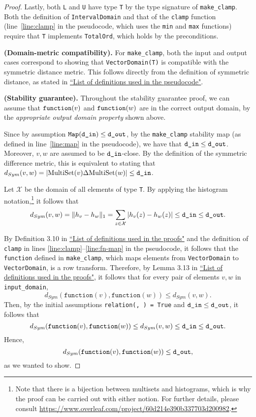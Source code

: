 \documentclass{article}
\begin{document}
\begin{proof}
Lastly, both \texttt{L} and \texttt{U} have type \texttt{T} by the type signature of \texttt{make\_clamp}. Both the definition of \texttt{IntervalDomain} and that of the \texttt{clamp} function (line~\ref{line:clamp} in the pseudocode, which uses the \texttt{min} and \texttt{max} functions) require that \texttt{T} implements \texttt{TotalOrd}, which holds by the preconditions.

\smallskip
\textbf{(Domain-metric compatibility).} For \texttt{make\_clamp}, both the input and output cases correspond to showing that \texttt{VectorDomain(T)} is compatible with the symmetric distance metric. This follows directly from the definition of symmetric distance, as stated in \href{https://www.overleaf.com/project/60d215bf90b337ac02200a99}{``List of definitions used in the pseudocode"}.

\smallskip
\textbf{(Stability guarantee).} Throughout the stability guarantee proof, we can assume that $\texttt{function}(v)$ and $\texttt{function}(w)$ are in the correct output domain, by the \textit{appropriate output domain property} shown above. 

Since by assumption $\texttt{Map}(\texttt{d\_in}) \leq \texttt{d\_out}$, by the \texttt{make\_clamp} stability map (as defined in line~\ref{line:map} in the pseudocode), we have that $\texttt{d\_in} \leq \texttt{d\_out}$. 
Moreover, $v, w$ are assumed to be $\texttt{d\_in}$-close. By the definition of the symmetric difference metric, this is equivalent to stating that $d_{Sym}(v, w) = |\mathrm{MultiSet}(v) \Delta \mathrm{MultiSet}(w)| \leq \texttt{d\_in}$.

Let $\mathcal{X}$ be the domain of all elements of type \texttt{T}. By applying the histogram notation,\footnote{Note that there is a bijection between multisets and histograms, which is why the proof can be carried out with either notion. For further details, please consult \url{https://www.overleaf.com/project/60d214e390b337703d200982}.}  it follows that
\[
d_{Sym}(v, w) = \lVert h_{v} - h_{w}\rVert_1 = \sum_{z \in \mathcal{X}} |h_v(z) - h_w(z)| \leq \texttt{d\_in} \leq \texttt{d\_out}.
\]

By Definition 3.10 in \href{https://www.overleaf.com/project/60d214e390b337703d200982}{``List of definitions used in the proofs"} and the definition of \texttt{clamp} in lines \ref{line:clamp}--\ref{line:fn-map} in the pseudocode, it follows that the \texttt{function} defined in \texttt{make\_clamp}, which maps elements from \texttt{VectorDomain} to \texttt{VectorDomain}, is a row transform. Therefore, by Lemma 3.13 in \href{https://www.overleaf.com/project/60d214e390b337703d200982}{``List of definitions used in the proofs"}, it follows that for every pair of elements $v, w$ in \texttt{input\_domain},
\[
    d_{Sym}(\texttt{function}(v), \texttt{function}(w)) \leq d_{Sym}(v, w).
\]
Then, by the initial assumptions \texttt{relation(\din, \dout) = True} and $\texttt{d\_in} \leq \texttt{d\_out}$, it follows that
\[
    d_{Sym}(\texttt{function}(v), \texttt{function}(w)) \leq d_{Sym}(v, w) \leq \texttt{d\_in} \leq \texttt{d\_out}.
\]
Hence,
\[
    d_{Sym}(\texttt{function}(v), \texttt{function}(w)) \leq \texttt{d\_out},
\]
as we wanted to show.
\end{proof}
\end{document}
